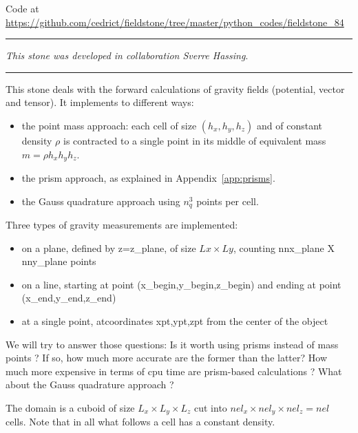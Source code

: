 

\begin{center}
Code at \url{https://github.com/cedrict/fieldstone/tree/master/python_codes/fieldstone_84}
\end{center}

\par\noindent\rule{\textwidth}{0.4pt}

{\sl This stone was developed in collaboration Sverre Hassing}. 

\par\noindent\rule{\textwidth}{0.4pt}

This stone deals with the forward calculations of gravity fields (potential, vector and tensor).
It implements to different ways: 
\begin{itemize}
\item the point mass approach: each cell of size $(h_x,h_y,h_z)$ and of constant density $\rho$
is contracted to a single point in its middle of equivalent mass $m=\rho h_xh_yh_z$.
\item the prism approach, as explained in Appendix~\ref{app:prisms}.
\item the Gauss quadrature approach using $n_q^3$ points per cell.
\end{itemize}

Three types of gravity measurements are implemented:
\begin{itemize}
\item on a plane, defined by z=z\_{plane}, of size $Lx \times Ly$, counting nnx\_plane X nny\_plane points
\item on a line, starting at point (x\_begin,y\_begin,z\_begin) and ending at point (x\_end,y\_end,z\_end)
\item at a single point, atcoordinates xpt,ypt,zpt from the center of the object
\end{itemize}


We will try to answer those questions:
Is it worth using prisms instead of mass points ?  
If so, how much more accurate are the former than the latter?
How much more expensive in terms of cpu time are prism-based calculations ?
What about the Gauss quadrature approach ? 

The domain is a cuboid of size $L_x\times L_y \times L_z$ cut into $nel_x \times nel_y \times nel_z=nel$ cells.
Note that in all what follows a cell has a constant density. 

